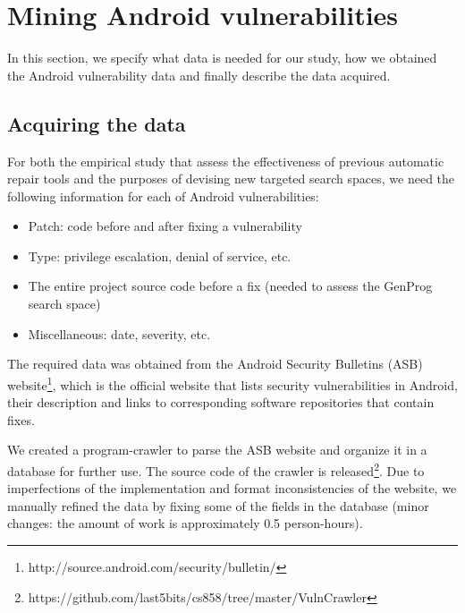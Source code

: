 \section{Mining Android vulnerabilities}
\label{section:mining}

In this section, we specify what data is needed for our study, how we obtained the Android vulnerability data and finally describe the data acquired.

\subsection{Acquiring the data}
\label{section:mining-acquiring}

For both the empirical study that assess the effectiveness of previous automatic repair tools and the purposes of devising new targeted search spaces, we need the following information for each of Android vulnerabilities:
\begin{itemize}
    \item Patch: code before and after fixing a vulnerability
    \item Type: privilege escalation, denial of service, etc.
    \item The entire project source code before a fix (needed to assess the GenProg search space)
    \item Miscellaneous: date, severity, etc.
\end{itemize}


The required data was obtained from the Android Security Bulletins (ASB) website\footnote{http://source.android.com/security/bulletin/}, which is the official website that lists security vulnerabilities in Android, their description and links to corresponding software repositories that contain fixes.

We created a program-crawler to parse the ASB website and organize it in a database for further use. The source code of the crawler is released\footnote{https://github.com/last5bits/cs858/tree/master/VulnCrawler}. Due to imperfections of the implementation and format inconsistencies of the website, we manually refined the data by fixing some of the fields in the database (minor changes: the amount of work is approximately 0.5 person-hours).

